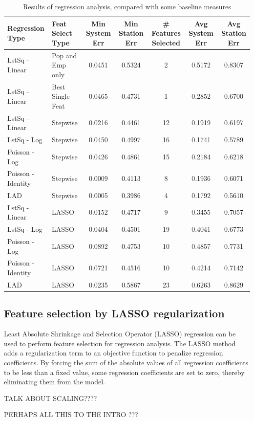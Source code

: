 \documentclass[11pt]{article}
\begin{document}
\begin{table}[H]
\begingroup\fontsize{8}{15}\selectfont
\centering
\begin{tabular}{ll|ccccc}
\toprule
Regression Type&Feat Select Type& Min System Err&Min Station Err& \# Features Selected& Avg System Err& Avg Station Err\\
\midrule
LstSq - Linear&Pop and Emp only&0.0451&0.5324&2&0.5172&0.8307\\
LstSq - Linear&Best Single Feat&0.0465&0.4731&1&0.2852&0.6700\\
\midrule
LstSq - Linear&Stepwise&0.0216&0.4461&12&0.1919&0.6197\\
LstSq - Log&Stepwise&0.0450&0.4997&16&0.1741&0.5789\\
Poisson - Log&Stepwise&0.0426&0.4861&15&0.2184&0.6218\\
Poisson - Identity&Stepwise&0.0009&0.4113&8&0.1936&0.6071\\
LAD&Stepwise&0.0005&0.3986&4&0.1792&0.5610\\
\midrule
LstSq - Linear&LASSO&0.0152&0.4717&9&0.3455&0.7057\\
LstSq - Log&LASSO&0.0404&0.4501&19&0.4041&0.6773\\
Poisson - Log&LASSO&0.0892&0.4753&10&0.4857&0.7731\\
Poisson - Identity&LASSO&0.0721&0.4516&10&0.4214&0.7142\\
LAD&LASSO&0.0235&0.5867&23&0.6263&0.8629\\
\end{tabular}
\caption{Results of regression analysis, compared with some baseline measures}\label{tab:rresults}
\endgroup
\end{table}


\subsection{Feature selection by LASSO regularization}\label{sec:lasso}

Least Absolute Shrinkage and Selection Operator (LASSO) regression can be used to perform feature selection for regression analysis. The LASSO method adds a regularization term to an objective function to penalize regression coefficients. By forcing the sum of the absolute values of all regression coefficients to be less than a fixed value, some regression coefficients are set to zero, thereby eliminating them from the model. 

TALK ABOUT SCALING????

PERHAPS ALL THIS TO THE INTRO ???
\end{document}
